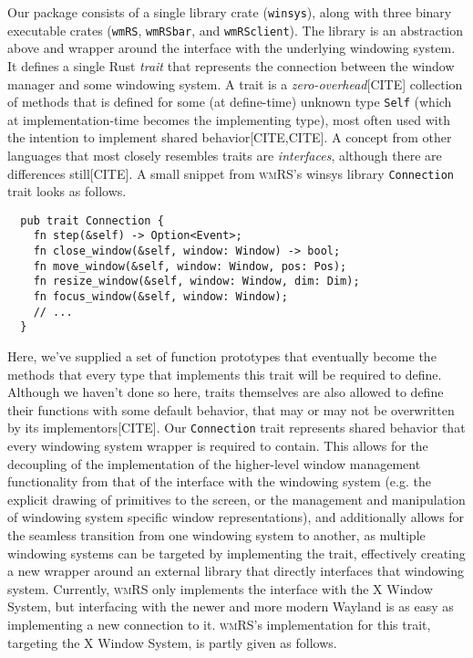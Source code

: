
Our  package  consists  of  a  single  library  crate  (\texttt{winsys}),  along
with  three  binary  executable  crates  (\texttt{wmRS},  \texttt{wmRSbar},  and
\texttt{wmRSclient}). The library is an abstraction above and wrapper around the
interface  with  the underlying  windowing  system.  It  defines a  single  Rust
\textit{trait} that  represents the  connection between  the window  manager and
some windowing system.  A trait is a  \textit{zero-overhead}[CITE] collection of
methods that  is defined  for some (at  define-time) unknown  type \texttt{Self}
(which at  implementation-time becomes the  implementing type), most  often used
with the intention to implement shared behavior[CITE,CITE]. A concept from other
languages that  most closely resembles traits  are \textit{interfaces}, although
there are differences  still[CITE]. A small snippet  from \textsc{wmRS}'s winsys
library \texttt{Connection} trait looks as follows.

\begin{verbatim}
  pub trait Connection {
    fn step(&self) -> Option<Event>;
    fn close_window(&self, window: Window) -> bool;
    fn move_window(&self, window: Window, pos: Pos);
    fn resize_window(&self, window: Window, dim: Dim);
    fn focus_window(&self, window: Window);
    // ...
  }
\end{verbatim}

Here, we've  supplied a set  of function  prototypes that eventually  become the
methods that every  type that implements this trait will  be required to define.
Although we haven't  done so here, traits themselves are  also allowed to define
their functions with  some default behavior, that may or  may not be overwritten
by  its  implementors[CITE].  Our \texttt{Connection}  trait  represents  shared
behavior that every windowing system wrapper is required to contain. This allows
for the decoupling  of the implementation of the  higher-level window management
functionality from  that of the  interface with  the windowing system  (e.g. the
explicit drawing of primitives to the screen, or the management and manipulation
of windowing  system specific  window representations), and  additionally allows
for the  seamless transition from one  windowing system to another,  as multiple
windowing  systems  can  be  targeted by  implementing  the  trait,  effectively
creating a new wrapper around an  external library that directly interfaces that
windowing system.  Currently, \textsc{wmRS}  only implements the  interface with
the X Window System,  but interfacing with the newer and  more modern Wayland is
as easy as  implementing a new connection to  it. \textsc{wmRS}'s implementation
for this trait, targeting the X Window System, is partly given as follows.

